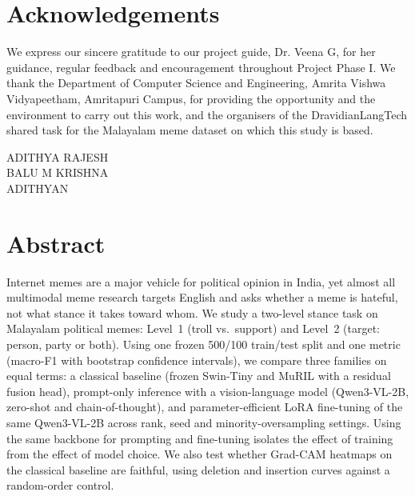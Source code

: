 \documentclass[a4paper, 12pt]{report}
\theoremstyle{definition}
\begin{document}
	\chapter*{Acknowledgements}
	We express our sincere gratitude to our project guide, Dr. Veena G, for her guidance, regular feedback and encouragement throughout Project Phase I. We thank the Department of Computer Science and Engineering, Amrita Vishwa Vidyapeetham, Amritapuri Campus, for providing the opportunity and the environment to carry out this work, and the organisers of the DravidianLangTech shared task for the Malayalam meme dataset on which this study is based.\\
	\vspace{1cm}
	\begin{flushright}
		ADITHYA RAJESH\\
		BALU M KRISHNA\\
		ADITHYAN
	\end{flushright}
	\listoffigures
	\listoftables
	\newpage

\chapter*{Abstract}
Internet memes are a major vehicle for political opinion in India, yet almost all multimodal meme research targets English and asks whether a meme is hateful, not what stance it takes toward whom. We study a two-level stance task on Malayalam political memes: Level~1 (troll vs.\ support) and Level~2 (target: person, party or both). Using one frozen 500/100 train/test split and one metric (macro-F1 with bootstrap confidence intervals), we compare three families on equal terms: a classical baseline (frozen Swin-Tiny and MuRIL with a residual fusion head), prompt-only inference with a vision-language model (Qwen3-VL-2B, zero-shot and chain-of-thought), and parameter-efficient LoRA fine-tuning of the same Qwen3-VL-2B across rank, seed and minority-oversampling settings. Using the same backbone for prompting and fine-tuning isolates the effect of training from the effect of model choice. We also test whether Grad-CAM heatmaps on the classical baseline are faithful, using deletion and insertion curves against a random-order control.
\end{document}
